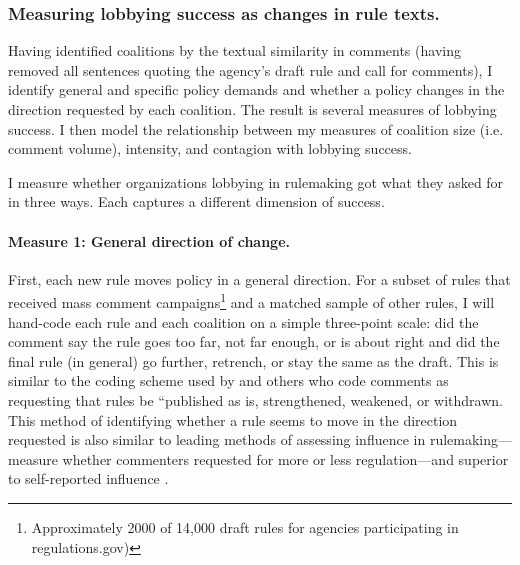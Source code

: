 

\subsubsection{Measuring lobbying success as changes in rule texts.}

Having identified coalitions by the textual similarity in comments (having removed all sentences quoting the agency's draft rule and call for comments), I identify general and specific policy demands and whether a policy changes in the direction requested by each coalition. The result is several measures of lobbying success. I then model the relationship between my measures of coalition size (i.e. comment volume), intensity, and contagion with lobbying success.


I measure whether organizations lobbying in rulemaking got what they asked for in three ways. Each captures a different dimension of success. 

\paragraph{Measure 1: General direction of change.}
First, each new rule moves policy in a general direction. For a subset of rules that received mass comment campaigns\footnote{Approximately 2000 of 14,000 draft rules for agencies participating in regulations.gov)} and a matched sample of other rules, I will hand-code each rule and each coalition on a simple three-point scale: did the comment say the rule goes too far, not far enough, or is about right and did the final rule (in general) go further, retrench, or stay the same as the draft. This is similar to the coding scheme used by \citep{Potter2017} and others who code comments as requesting that rules be ``published as is, strengthened, weakened, or withdrawn. This method of identifying whether a rule seems to move in the direction requested is also similar to leading  methods of assessing influence in rulemaking---\citet{Yackee2006JOP} measure whether commenters requested for more or less regulation---and superior to self-reported influence \citep{Furlong1997}.

